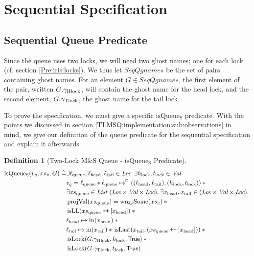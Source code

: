 \documentclass[a4paper, 10pt]{report}
\theoremstyle{definition}
\newtheorem{definition}{Definition}[section]
\newcommand{\isLock}{\operatorname{isLock}}
\newcommand{\msq}{M\&S Queue}
\newcommand{\tlmsq}{Two-Lock \msq{}}
\newcommand{\isqueueseq}{\operatorname{isQueue_{S}}}
\newcommand{\SeqQgnames}{SeqQgnames}
\newcommand{\vq}{v_q}
\newcommand{\xsqueue}{xs_{\mathrm{queue}}}
\newcommand{\isLL}{\operatorname{isLL}}
\newcommand{\projval}{\operatorname{projVal}}
\newcommand{\wrapsome}{\operatorname{wrapSome}}
\newcommand{\isLast}{\operatorname{isLast}}
\newcommand{\locN}[1]{\loc_{\mathrm{#1}}}
\newcommand{\lochead}{\locN{head}}
\newcommand{\loctail}{\locN{tail}}
\newcommand{\locqueue}{\locN{queue}}
\newcommand{\nIn}[1]{\operatorname{in}(#1)}
\newcommand{\node}{x}
\newcommand{\nodeN}[1]{\node_{\mathrm{#1}}}
\newcommand{\nodehead}{\nodeN{head}}
\newcommand{\nodetail}{\nodeN{tail}}
\newcommand{\absvalueList}{xs_v}
\newcommand{\Hlock}{h_{\mathrm{lock}}}
\newcommand{\Tlock}{t_{\mathrm{lock}}}
\newcommand{\Qg}{G}
\newcommand{\ghlock}{\gname_{\mathrm{Hlock}}}
\newcommand{\gtlock}{\gname_{\mathrm{Tlock}}}
\newcommand\catenate{\mathbin{\text{\ttfamily\upshape ++}}}
\begin{document}
\section{Sequential Specification}
\label{TLMSQSPECS:section:sequential}

\subsection{Sequential Queue Predicate}
\label{TLMSQSPECS:sequential:sub:seq-queue-pred}

Since the queue uses two locks, we will need two ghost names; one for each lock (cf. section \ref{Pre:iris:locks}). We thus let $\SeqQgnames$ be the set of pairs containing ghost names. For an element $\Qg \in \SeqQgnames$, the first element of the pair, written $\Qg.\ghlock$, will contain the ghost name for the head lock, and the second element, $\Qg.\gtlock$, the ghost name for the tail lock.

To prove the specification, we must give a specific $\isqueueseq$ predicate. With the points we discussed in section \ref{TLMSQ:implementation:sub:observations} in mind, we give our definition of the queue predicate for the sequential specification and explain it afterwards.
\begin{definition}[\tlmsq{} - $\isqueueseq$ Predicate]\label{TLMSQ:spec:seq:isqueueseq}
\begin{align*}
  \isqueueseq(\vq, \absvalueList, \Qg) \eqdef
  &\Exists \locqueue, \lochead, \loctail \in \Loc . \Exists \Hlock, \Tlock \in \Val . \\
  &\vq = \locqueue \star{} \locqueue \mapsto^{\persistently} ((\lochead, \loctail), (\Hlock, \Tlock)) \star{}\\
  &\Exists \xsqueue \in \List ~ (\Loc \times \Val \times \Loc) . \Exists \nodehead, \nodetail \in (\Loc \times \Val \times \Loc) .\\
	&\projval(\xsqueue) = \wrapsome(\absvalueList) \star{}\\
	&\isLL (\xsqueue \catenate [\nodehead]) \star{}\\
	&\lochead \mapsto \nIn{\nodehead} \star{}\\
	&\loctail \mapsto \nIn{\nodetail} \star{} \isLast(\nodetail, (\xsqueue \catenate [\nodehead])) \star{}\\
	&\isLock(\Qg.\ghlock, \Hlock, \TRUE) \star{}\\
	&\isLock(\Qg.\gtlock, \Tlock, \TRUE)
\end{align*}
\end{definition}
\end{document}
